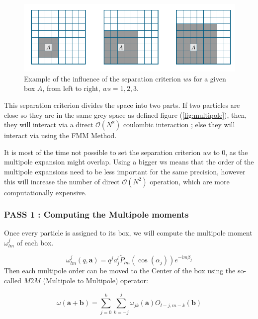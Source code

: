 \documentclass[11pt,twoside,a4paper]{report}
\begin{document}
	
	
	
	\begin{figure}[H]
    \includegraphics[scale=0.7]{separation}    
    \centering 
    \caption{Example of the influence of the separation criterion $ws$ for a given box $A$, from left to right, $ws = 1,2,3$.}    
    \label{fig:depth}
     \end{figure}
	
		This separation criterion divides the space into two parts. If two particles are close so they are in the same grey space as defined figure (\ref{fig:multipole}), then, they will interact via a direct $\mathcal{O}(N^2)$ coulombic interaction ; else they will interact via using the FMM Method.
	
	It is most of the time not possible to set the separation criterion $ws$ to 0, as the multipole expansion might overlap. Using a bigger ws means that the order of the multipole expansions need to be less important for the same precision, however this will increase the number of direct $\mathcal{O}(N^2)$ operation, which are  more computationally expensive.       
    
    
    \subsubsection{PASS 1 : Computing the Multipole moments}
    
    Once every particle is assigned to its box, we will compute the multipole moment $\omega_{lm}^j$ of each box.
    
    \begin{equation}
    \omega_{lm}^{j}(q,\textbf{a}) = q^j a_j^l \widetilde{P}_{lm}(\cos(\alpha_j))e^{-im\beta_j}
    \end{equation}
%
Then each multipole order can be moved to the Center of the box using the so-called $M2M$ (Multipole to Multipole) operator:    
    
    \begin{equation}
    \omega(\textbf{a} + \textbf{b}) = \sum\limits_{j=0}^{k} \sum\limits_{k=-j}^{j} \omega_{jk}(\textbf{a}) O_{l-j,m-k}(\textbf{b})
    \end{equation}
\end{document}
